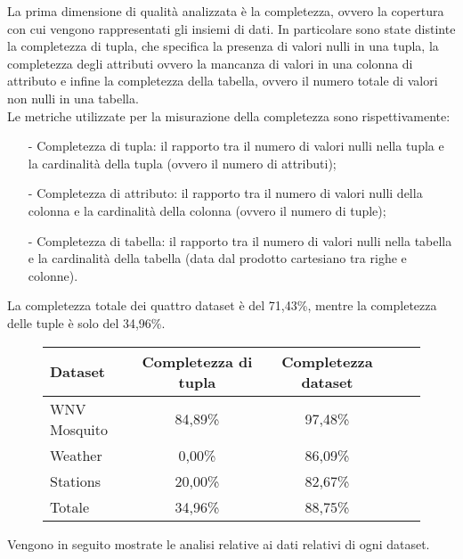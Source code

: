La prima dimensione di qualità analizzata è la completezza, ovvero la copertura con cui vengono rappresentati gli insiemi di dati.
In particolare sono state distinte la completezza di tupla, che specifica la presenza di valori nulli in una tupla, la completezza degli attributi ovvero la mancanza di valori in una colonna di attributo e infine la completezza della tabella, ovvero il numero totale di valori non nulli in una tabella.\\

Le metriche utilizzate per la misurazione della completezza sono rispettivamente:\\
\begin{itemize}
		\item[-] Completezza di tupla: il rapporto tra il numero di valori nulli nella tupla e la cardinalità della tupla (ovvero il numero di attributi);
		\item[-] Completezza di attributo: il rapporto tra il numero di valori nulli della colonna e la cardinalità della colonna (ovvero il numero di tuple);
		\item[-] Completezza di tabella: il rapporto tra il numero di valori nulli nella tabella e la cardinalità della tabella (data dal prodotto cartesiano tra righe e colonne).
\end{itemize}


La completezza totale dei quattro dataset è del 71,43\%, mentre la completezza delle tuple è solo del 34,96\%.

\begin{figure}[H]
	\centering
	\begin{tabular}{lcccc}
		\toprule
		\textbf{Dataset} \quad & \textbf{Completezza di tupla} & \textbf{Completezza dataset} \\
		\midrule
		WNV Mosquito &		84,89\%  	& 97,48\%  \\ 
		Weather 	 &		 0,00\% 	& 86,09\%  \\ 
		Stations 	 &		20,00\% 	& 82,67\%  \\ 
		\midrule
		Totale 		 &	    34,96\%     & 88,75\%  \\
		\bottomrule
	\end{tabular}
	\label{tab:completezza totale}
\end{figure}

Vengono in seguito mostrate le analisi relative ai dati relativi di ogni dataset.


